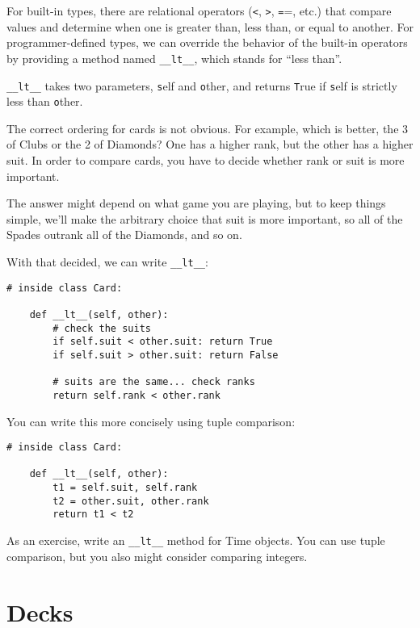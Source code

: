 \documentclass[
DIV=11,
fontsize=13,
twoside,
headinclude=false,
titlepage=firstiscover,
abstract=true,
headsepline=true,
footsepline=true,
chapterprefix=true, %
headings=big,
bibliography=totoc,%
captions=tableheading
]{scrbook}
\theoremstyle{definition}
\begin{document}
For built-in types, there are relational operators
({\texttt <}, {\texttt >}, {\texttt ==}, etc.)
that compare
values and determine when one is greater than, less than, or equal to
another.  For programmer-defined types, we can override the behavior of
the built-in operators by providing a method named
\verb"__lt__", which stands for ``less than''.

\verb"__lt__" takes two parameters, {\texttt self} and {\texttt other},
and returns {\texttt True} if {\texttt self} is strictly less than {\texttt other}.

The correct ordering for cards is not obvious.
For example, which
is better, the 3 of Clubs or the 2 of Diamonds?  One has a higher
rank, but the other has a higher suit.  In order to compare
cards, you have to decide whether rank or suit is more important.

The answer might depend on what game you are playing, but to keep
things simple, we'll make the arbitrary choice that suit is more
important, so all of the Spades outrank all of the Diamonds,
and so on.

With that decided, we can write \verb"__lt__":

\begin{lstlisting}
# inside class Card:

    def __lt__(self, other):
        # check the suits
        if self.suit < other.suit: return True
        if self.suit > other.suit: return False

        # suits are the same... check ranks
        return self.rank < other.rank
\end{lstlisting}
%
You can write this more concisely using tuple comparison:

\begin{lstlisting}
# inside class Card:

    def __lt__(self, other):
        t1 = self.suit, self.rank
        t2 = other.suit, other.rank
        return t1 < t2
\end{lstlisting}
%
As an exercise, write an \verb"__lt__" method for Time objects.  You
can use tuple comparison, but you also might consider 
comparing integers.


\section{Decks}
\end{document}
